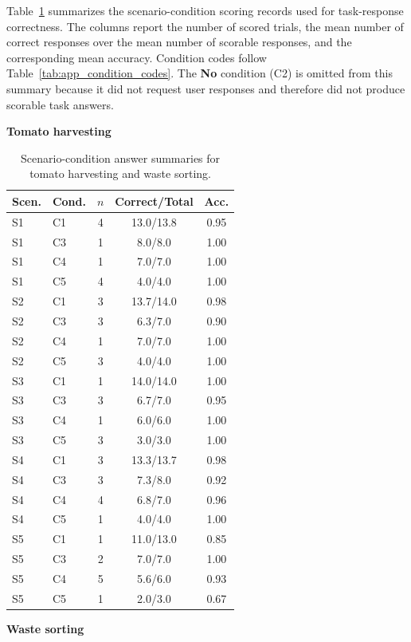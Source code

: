 Table~\ref{tab:app_answer_summary} summarizes the scenario-condition scoring records used for task-response correctness. The columns report the number of scored trials, the mean number of correct responses over the mean number of scorable responses, and the corresponding mean accuracy. Condition codes follow Table~\ref{tab:app_condition_codes}. The \textbf{No} condition (C2) is omitted from this summary because it did not request user responses and therefore did not produce scorable task answers.

\begin{table}[t]
\centering
\caption{Scenario-condition answer summaries for tomato harvesting and waste sorting.}
\label{tab:app_answer_summary}
\begin{minipage}[t]{0.48\textwidth}
\centering
\textbf{Tomato harvesting}
\vspace{2pt}

\scriptsize
\setlength{\tabcolsep}{0pt}
\begin{tabular*}{\linewidth}{@{\extracolsep{\fill}}llccc}
\toprule
\textbf{Scen.} & \textbf{Cond.} & \textbf{$n$} & \textbf{Correct/Total} & \textbf{Acc.} \\
\midrule
S1 & C1 & 4 & 13.0/13.8 & 0.95 \\
S1 & C3 & 1 & 8.0/8.0 & 1.00 \\
S1 & C4 & 1 & 7.0/7.0 & 1.00 \\
S1 & C5 & 4 & 4.0/4.0 & 1.00 \\
S2 & C1 & 3 & 13.7/14.0 & 0.98 \\
S2 & C3 & 3 & 6.3/7.0 & 0.90 \\
S2 & C4 & 1 & 7.0/7.0 & 1.00 \\
S2 & C5 & 3 & 4.0/4.0 & 1.00 \\
S3 & C1 & 1 & 14.0/14.0 & 1.00 \\
S3 & C3 & 3 & 6.7/7.0 & 0.95 \\
S3 & C4 & 1 & 6.0/6.0 & 1.00 \\
S3 & C5 & 3 & 3.0/3.0 & 1.00 \\
S4 & C1 & 3 & 13.3/13.7 & 0.98 \\
S4 & C3 & 3 & 7.3/8.0 & 0.92 \\
S4 & C4 & 4 & 6.8/7.0 & 0.96 \\
S4 & C5 & 1 & 4.0/4.0 & 1.00 \\
S5 & C1 & 1 & 11.0/13.0 & 0.85 \\
S5 & C3 & 2 & 7.0/7.0 & 1.00 \\
S5 & C4 & 5 & 5.6/6.0 & 0.93 \\
S5 & C5 & 1 & 2.0/3.0 & 0.67 \\
\bottomrule
\end{tabular*}
\end{minipage}
\hfill
\begin{minipage}[t]{0.48\textwidth}
\centering
\textbf{Waste sorting}
\vspace{2pt}


\end{minipage}
\end{table}
